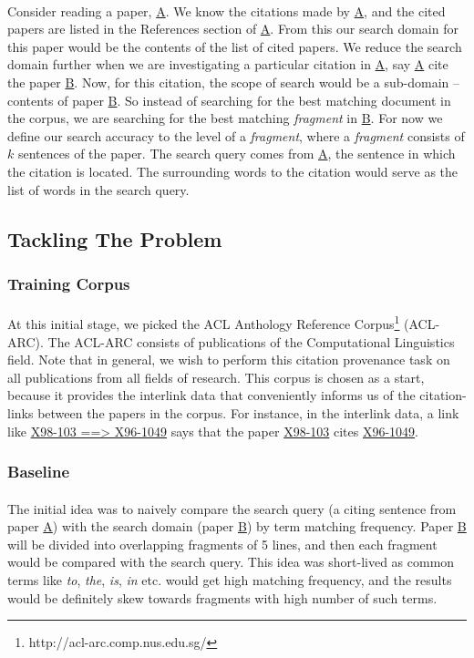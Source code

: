 \documentclass[12 pt]{article}
\begin{document}
\paragraph{}
Consider reading a paper, \url{A}. We know the citations made by \url{A}, and the cited papers are listed in the References section of \url{A}. From this our search domain for this paper would be the contents of the list of cited papers. We reduce the search domain further when we are investigating a particular citation in \url{A}, say \url{A} cite the paper \url{B}. Now, for this citation, the scope of search would be a sub-domain -- contents of paper \url{B}. So instead of searching for the best matching document in the corpus, we are searching for the best matching \textit{fragment} in \url{B}. For now we define our search accuracy to the level of a \textit{fragment}, where a \textit{fragment} consists of $k$ sentences of the paper. The search query comes from \url{A}, the sentence in which the citation is located. The surrounding words to the citation would serve as the list of words in the search query.

\subsection{Tackling The Problem}
\subsubsection{Training Corpus}
\paragraph{}
At this initial stage, we picked the ACL Anthology Reference Corpus\footnote{http://acl-arc.comp.nus.edu.sg/} (ACL-ARC). The ACL-ARC consists of publications of the Computational Linguistics field. Note that in general, we wish to perform this citation provenance task on all publications from all fields of research. This corpus is chosen as a start, because it provides the interlink data that conveniently informs us of the citation-links between the papers in the corpus. For instance, in the interlink data, a link like \url{X98-103 ==> X96-1049} says that the paper \url{X98-103} cites \url{X96-1049}.

\subsubsection{Baseline}
\paragraph{}
The initial idea was to naively compare the search query (a citing sentence from paper \url{A}) with the search domain (paper \url{B}) by term matching frequency. Paper \url{B} will be divided into overlapping fragments of 5 lines, and then each fragment would be compared with the search query. This idea was short-lived as common terms like \textit{to}, \textit{the}, \textit{is}, \textit{in} etc. would get high matching frequency, and the results would be definitely skew towards fragments with high number of such terms.
\end{document}
